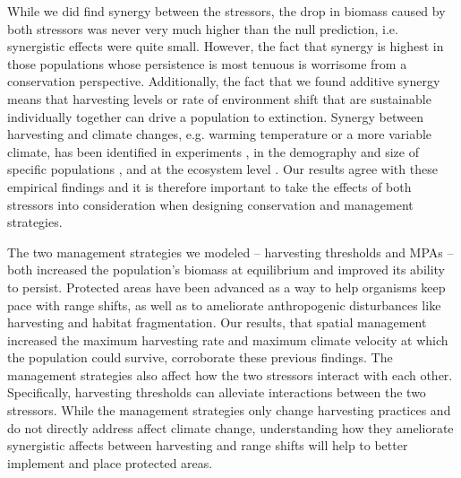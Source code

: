 \documentclass[12pt,english]{article}
\begin{document}
While we did find synergy between the stressors, the drop in biomass caused by both stressors was never very much higher than the null prediction, i.e. synergistic effects were quite small.  However, the fact that synergy is highest in those populations whose persistence is most tenuous is worrisome from a conservation perspective.  Additionally, the fact that we found additive synergy means that harvesting levels or rate of environment shift that are sustainable individually together can drive a population to extinction.  Synergy between harvesting and climate changes, e.g. warming temperature or a more variable climate, has been identified in experiments \citep{Moraetal2007}, in the demography and size of specific populations \citep{Planque:2010uq}, and at the ecosystem level \citep{Kirby:2009fk}.  Our results  agree with these empirical findings and it is therefore important to take the effects of both stressors into consideration when designing conservation and management strategies.

The two management strategies we modeled -- harvesting thresholds and MPAs -- both increased the population's biomass at equilibrium and improved its ability to persist.  Protected areas have been advanced as a way to help organisms keep pace with range shifts, as well as to ameliorate anthropogenic disturbances like harvesting and habitat fragmentation\citep{Lawleretal2010, Hannahetal2007,Botsfordetal2001, Gaylordetal2005, HastingsBotsford2003,Thomasetal2012}.  Our results, that spatial management increased the maximum harvesting rate and maximum climate velocity at which the population could survive, corroborate these previous findings.  The management strategies also affect how the two stressors interact with each other.  Specifically, harvesting thresholds can alleviate interactions between the two stressors.   While the management strategies only change harvesting practices and do not directly address affect climate change, understanding how they ameliorate synergistic affects between harvesting and range shifts will help to better implement and place protected areas.
\end{document}
